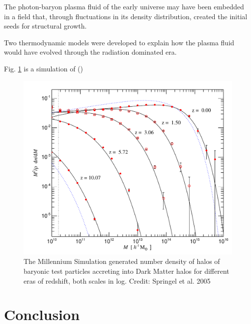 \documentclass{paper}
\begin{document}
  The photon-baryon plasma fluid of the early universe may have been embedded
  in a field that, through fluctuations in its density distribution, created
  the initial seeds for structural growth.

  Two thermodynamic models were developed to explain how the plasma fluid
  would have evolved through the radiation dominated era. 

  Fig. \ref{fig:Struct-halo_accretion} is a simulation of %
  (\cite{2005Natur.435..629S})

  \begin{figure}[!htb]
    \begin{centering}
    \includegraphics[scale=0.6]{Struct-halo_accretion.pdf}
    \caption{The Millennium Simulation generated number density of halos of 
      baryonic test particles accreting into Dark Matter halos for different 
      eras of redshift, both scales in log. 
    Credit: Springel et al. 2005}
    \label{fig:Struct-halo_accretion}
    \end{centering}
  \end{figure}
  

\section{Conclusion}
\end{document}
